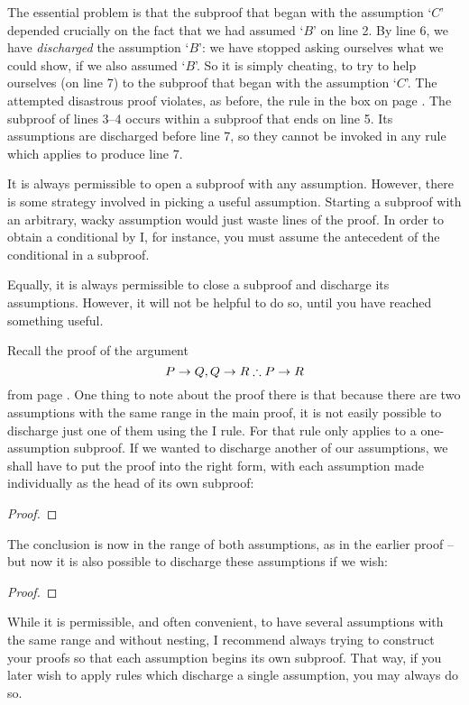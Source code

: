 The essential problem is that the subproof that began with the assumption `$C$' depended crucially on the fact that we had assumed `$B$' on line 2. By line 6, we have \emph{discharged} the assumption `$B$': we have stopped asking ourselves what we could show, if we also assumed `$B$'. So it is simply cheating, to try to help ourselves (on line 7) to the subproof that began with the assumption `$C$'. The attempted disastrous proof violates, as before, the rule in the box on page \pageref{subproof.rule}. The subproof of lines 3–4 occurs within a subproof that ends on line 5. Its assumptions are discharged before line 7, so they cannot be invoked in any rule which applies to produce line 7.

It is always permissible to open a subproof with any assumption. However, there is some strategy involved in picking a useful assumption. Starting a subproof with an arbitrary, wacky assumption would just waste lines of the proof. In order to obtain a conditional by {\eif}I, for instance, you must assume the antecedent of the conditional in a subproof. 

Equally, it is always permissible to close a subproof and discharge its assumptions. However, it will not be helpful to do so, until you have reached something useful.

Recall the proof of the argument $$P \rightarrow Q, Q \rightarrow R \mathrel{\therefore} P \rightarrow R$$ from page \pageref{HSproof}. One thing to note about the proof there is that because there are two assumptions with the same range in the main proof, it is not easily possible to discharge just one of them using the {\eif}I rule. For that rule only applies to a one-assumption subproof. If we wanted to discharge another of our assumptions, we shall have to put the proof into the right form, with each assumption made individually as the head of its own subproof:
\begin{proof}
	\open
	\open
	\close
\end{proof} The conclusion is now in the range of both assumptions, as in the earlier proof – but now it is also possible to discharge these assumptions if we wish: \begin{proof}
	\open {}
	\open
	\open
	\close
	\close
	\close
\end{proof} 
While it is permissible, and often convenient, to have several assumptions with the same range and without nesting, I recommend always trying to construct your proofs so that each assumption begins its own subproof. That way, if you later wish to apply rules which discharge a single assumption, you may always do so.


